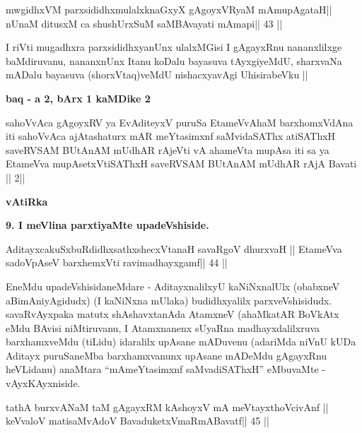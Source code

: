 \begin{shl}
mwgidhxVM parxsididhxmulalxknaGxyX gAgoyxVR\s yaM mAmupAgataH||
nUnaM ditusxM ca shushUrxSuM saMBAvayati mAmapi\hfill || 43 ||
\end{shl}

\begin{artha}
I riVti mugadhxra parxsididhxyanUnx ulalxMGisi I gAgayxRnu nananxlilxge baMdiruvanu, nananxnUnx Itanu koDalu bayasuva tAyxgiyeMdU, sharxvaNa mADalu bayasuva (shorxVtaq)veMdU nishacxyavAgi UhisirabeVku ||
\end{artha}

\begin{center}
{\bf baq - a 2, bArx 1 kaMDike 2}
\end{center}

\begin{shl}
sahoVvAca gAgoyxRV ya EvA\s diteyxV puruSa
EtameVvAhaM barxhomxVdAna iti sahoVvAca
ajAtashaturx mAR meYtasimxnf saMvidaSAThx atiSAThxH
saveRVSAM BUtAnAM mUdhAR rAjeVti vA
ahameVta mupAsa iti sa ya EtameVva
mupAsetxV\s tiSAThxH saveRVSAM BUtAnAM mUdhAR
rAjA Bavati || 2||
\end{shl}

\begin{center}
{\bf vAtiRka}
\end{center}

\begin{artha}
{\bf 9. I meVlina parxtiyaMte upadeVshiside.}
\end{artha}

\begin{shl}
AditayxcakuSxbuRdidhxsathxshecxVtanaH savaRgoV dhurxvaH ||
EtameVva sadoVpAseV barxhemxVti ravimadhayxgamf\hfill || 44 ||
\end{shl}

\begin{artha}
EneMdu upadeVshisidaneMdare - AditayxnalilxyU kaNiNxnalUlx (obabxneV 
aBimAniyAgidudx) (I kaNiNxna mUlaka) budidhxyalilx parxveVshisidudx. 
savaRvAyxpaka matutx shAshavxtanAda AtamxneV (ahaMkatAR BoVkAtx eMdu 
BAvisi niMtiruvanu, I Atamxnanenx sUyaRna madhayxdalilxruva 
barxhamxveMdu (tiLidu) idaralilx upAsane mADuvenu (adariMda niVnU kUDa 
Aditayx puruSaneMba barxhamxvanunx upAsane mADeMdu gAgayxRnu heVLidanu) 
anaMtara ``mAmeYtasimxnf saMvadiSAThxH'' eMbuvaMte - vAyxKAyxniside.
\end{artha}

\begin{shl}
tathA burxvANaM taM gAgayxRM kAshoyxV mA meVtayxthoVcivAnf ||
keVvaloV matisaMvAdoV BavaduketxVmaRmABavatf\hfill || 45 ||
\end{shl}

